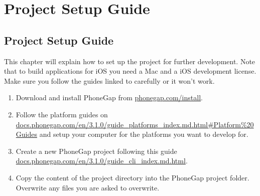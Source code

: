 \chapter{Project Setup Guide}

\clearpage

\section*{Project Setup Guide}
This chapter will explain how to set up the project for further development. Note that to build applications for iOS you need a Mac and a iOS development license\cite{iosCost}. Make sure you follow the guides linked to carefully or it won't work.

\begin{enumerate}
	\item{Download and install PhoneGap from \href{http://phonegap.com/install/}{phonegap.com/install}.}
	\item{Follow the platform guides on \newline \href{http://docs.phonegap.com/en/3.1.0/guide_platforms_index.md.html#Platform%20Guides}{docs.phonegap.com/en/3.1.0/guide\_platforms\_index.md.html\#Platform\%20Guides} and setup your computer for the platforms you want to develop for.}
	\item{Create a new PhoneGap project following this guide \newline \href{http://docs.phonegap.com/en/3.1.0/guide_cli_index.md.html}{docs.phonegap.com/en/3.1.0/guide\_cli\_index.md.html}.}
	\item{Copy the content of the project directory into the PhoneGap project folder. Overwrite any files you are asked to overwrite.}
\end{enumerate}